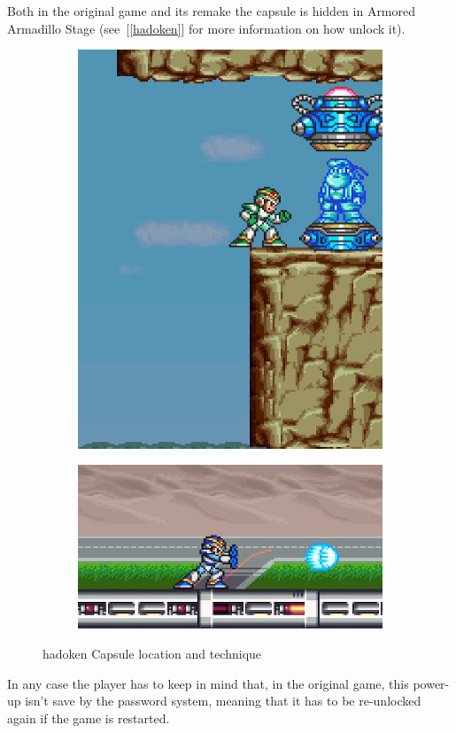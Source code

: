 \begin{itemize}
	Both in the original game and its remake the capsule is hidden in Armored Armadillo Stage (see~[\ref{hadoken}] for more information on how unlock it).
	\begin{figure}[htp]
		\centering
		\begin{subfigure}{0.3\linewidth}
			\centering
			\includegraphics[width=\textwidth]{figures/X1/Armored_armadillo/Armadillo_hadoken.jpg}
		\end{subfigure}
		\begin{subfigure}{0.5\linewidth}
			\centering
			\includegraphics[width=\textwidth]{figures/X1/weapons/hadoken.jpg}
		\end{subfigure}
		\caption{hadoken Capsule location and technique}
	\end{figure}
	In any case the player has to keep in mind that, in the original game, this power-up isn't save by the password system, meaning that it has to be re-unlocked again if the game is restarted.
\end{itemize}

